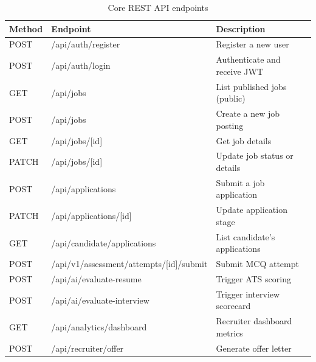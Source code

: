 \begin{table}[htbp]
\centering
\caption{Core REST API endpoints}
\small
\begin{tabular}{p{0.7in}p{2.5in}p{2.3in}}
\toprule
\textbf{Method} & \textbf{Endpoint} & \textbf{Description} \\
\midrule
POST   & /api/auth/register         & Register a new user \\
POST   & /api/auth/login            & Authenticate and receive JWT \\
GET    & /api/jobs                  & List published jobs (public) \\
POST   & /api/jobs                  & Create a new job posting \\
GET    & /api/jobs/[id]             & Get job details \\
PATCH  & /api/jobs/[id]             & Update job status or details \\
POST   & /api/applications          & Submit a job application \\
PATCH  & /api/applications/[id]     & Update application stage \\
GET    & /api/candidate/applications & List candidate's applications \\
POST   & /api/v1/assessment/attempts/[id]/submit & Submit MCQ attempt \\
POST   & /api/ai/evaluate-resume    & Trigger ATS scoring \\
POST   & /api/ai/evaluate-interview & Trigger interview scorecard \\
GET    & /api/analytics/dashboard   & Recruiter dashboard metrics \\
POST   & /api/recruiter/offer       & Generate offer letter \\
\bottomrule
\end{tabular}
\end{table}
